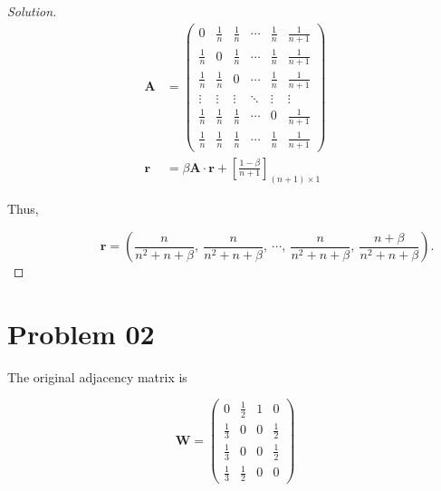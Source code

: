 \documentclass{article}
\newenvironment{solution}{\begin{proof}[\noindent\it Solution]}{\end{proof}}
\newcommand{\bd}[1]{\boldsymbol{#1}}
\begin{document}
\begin{solution}
    \vspace{-2em}
    \begin{align*}
        \bd{A} &= \left(
            \begin{array}{cccccc}
                0 & \frac{1}{n} & \frac{1}{n} & \cdots & \frac{1}{n} & \frac{1}{n+1} \\
                \frac{1}{n} & 0 & \frac{1}{n} & \cdots & \frac{1}{n} & \frac{1}{n+1} \\
                \frac{1}{n} & \frac{1}{n} & 0 & \cdots & \frac{1}{n} & \frac{1}{n+1} \\
                \vdots & \vdots & \vdots & \ddots & \vdots & \vdots \\
                \frac{1}{n} & \frac{1}{n} & \frac{1}{n} & \cdots & 0 & \frac{1}{n+1} \\
                \frac{1}{n} & \frac{1}{n} & \frac{1}{n} & \cdots & \frac{1}{n} & \frac{1}{n+1}
            \end{array}
        \right) \\
        \bd{r} &= \beta \bd{A}\cdot \bd{r} + \left[\frac{1-\beta}{n+1}\right]_{(n+1)\times 1}
    \end{align*}

    \hspace{2.6em}
    Thus,

    \vspace{-1.25em}
    $$\qquad\qquad\quad\bd{r} = \left(\dfrac{n}{n^2+n+\beta},\ \dfrac{n}{n^2+n+\beta},\ \cdots,\ \dfrac{n}{n^2+n+\beta},\ \dfrac{n+\beta}{n^2+n+\beta}\right).$$

    \vspace{-3.25em}
\end{solution}

\vspace{1em}
\section{Problem 02}
\vspace{1em}
    The original adjacency matrix is 

    \vspace{-1.5em}
    $$\bd{W} =  \left(
        \begin{array}{cccc}
            0 & \frac{1}{2} & 1 & 0 \\
            \frac{1}{3} & 0 & 0 & \frac{1}{2} \\
            \frac{1}{3} & 0 & 0 & \frac{1}{2} \\
            \frac{1}{3} & \frac{1}{2} & 0 & 0 
        \end{array}
    \right)$$
\end{document}
